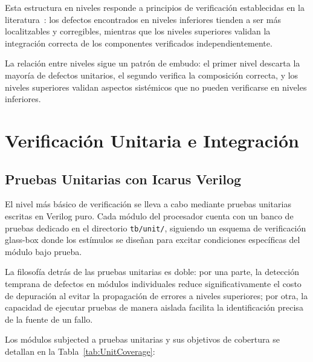 Esta estructura en niveles responde a principios de verificación establecidas en la literatura~\cite{VerificacionMetodologia}: los defectos encontrados en niveles inferiores tienden a ser más localitzables y corregibles, mientras que los niveles superiores validan la integración correcta de los componentes verificados independientemente.

La relación entre niveles sigue un patrón de embudo: el primer nivel descarta la mayoría de defectos unitarios, el segundo verifica la composición correcta, y los niveles superiores validan aspectos sistémicos que no pueden verificarse en niveles inferiores.

\section{Verificación Unitaria e Integración}
\label{sec:UnitIntegration}

\subsection{Pruebas Unitarias con Icarus Verilog}
\label{sec:UnitTests}

El nivel más básico de verificación se lleva a cabo mediante pruebas unitarias escritas en Verilog puro. Cada módulo del procesador cuenta con un banco de pruebas dedicado en el directorio \texttt{tb/unit/}, siguiendo un esquema de verificación glass-box donde los estímulos se diseñan para excitar condiciones específicas del módulo bajo prueba.

La filosofía detrás de las pruebas unitarias es doble: por una parte, la detección temprana de defectos en módulos individuales reduce significativamente el costo de depuración al evitar la propagación de errores a niveles superiores; por otra, la capacidad de ejecutar pruebas de manera aislada facilita la identificación precisa de la fuente de un fallo.

Los módulos subjected a pruebas unitarias y sus objetivos de cobertura se detallan en la Tabla~\ref{tab:UnitCoverage}:

